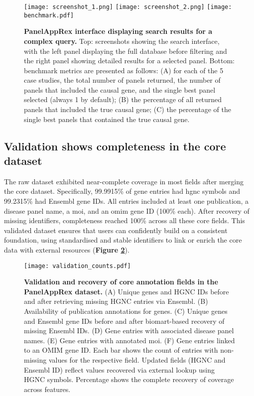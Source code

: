 \begin{figure}[ht]
    \centering
    \texttt{[image: screenshot\_1.png]}
    \texttt{[image: screenshot\_2.png]}    
    \texttt{[image: benchmark.pdf]}    
\caption{\textbf{PanelAppRex interface displaying search results for a complex query.} Top: screenshots showing the search interface, with the left panel displaying the full database before filtering and the right panel showing detailed results for a selected panel. Bottom: benchmark metrics are presented as follows: (A) for each of the 5 case studies, the total number of panels returned, the number of panels that included the causal gene, and the single best panel selected (always 1 by default); (B) the percentage of all returned panels that included the true causal gene; (C) the percentage of the single best panels that contained the true causal gene.}
    \label{fig:performance}
\end{figure}

\subsection{Validation shows completeness in the core dataset}
\noindent
The raw dataset exhibited near-complete coverage in most fields after merging the core dataset. 
Specifically, 99.9915\% of gene entries had \ac{hgnc} symbols %
and 99.2315\% had Ensembl gene IDs. %
All entries included at least one publication, a disease panel name, a \ac{moi}, and an \ac{omim} gene ID (100\% each). 
After recovery of missing identifiers, completeness reached 100\% across all these core fields.
This validated dataset ensures that users can confidently build on a consistent foundation, using standardised and stable identifiers to link or enrich the core data with external resources (\textbf{Figure \ref{fig:validation}}).

\begin{figure}[ht]
    \centering
    \texttt{[image: validation\_counts.pdf]}
\caption{\textbf{Validation and recovery of core annotation fields in the PanelAppRex dataset.}
(A) Unique genes and HGNC IDs before and after retrieving missing HGNC entries via Ensembl.
(B) Availability of publication annotations for genes.
(C) Unique genes and Ensembl gene IDs before and after biomart-based recovery of missing Ensembl IDs.
(D) Gene entries with associated disease panel names.
(E) Gene entries with annotated \ac{moi}.
(F) Gene entries linked to an OMIM gene ID.
Each bar shows the count of entries with non-missing values for the respective field. Updated fields (HGNC and Ensembl ID) reflect values recovered via external lookup using HGNC symbols. Percentage shows the complete recovery of coverage across features.
}
    \label{fig:validation}
\end{figure}

